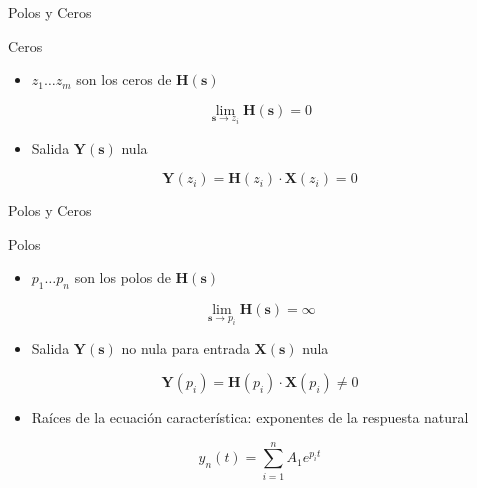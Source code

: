 \documentclass[xcolor={usenames,svgnames,dvipsnames}]{beamer}
\newcommand{\laplace}[1]{\mathbf{#1}(\mathbf{s})}
\newcommand{\slp}{\mathbf{s}}
\begin{document}
\begin{frame}[label={sec:orgd50bdfe}]{Polos y Ceros}
\begin{block}{Ceros}
\begin{itemize}
\item \(z_1 \ldots z_m\) son los ceros de \(\laplace{H}\)
\end{itemize}

\[
\lim_{\slp \to z_i}\laplace{H} = 0
\]

\begin{itemize}
\item Salida \(\laplace{Y}\) nula
\end{itemize}

\[
\mathbf{Y}(z_i) = \mathbf{H}(z_i) \cdot \mathbf{X}(z_i)  = 0
\]
\end{block}
\end{frame}

\begin{frame}[label={sec:org9e2dd8b}]{Polos y Ceros}
\begin{block}{Polos}
\begin{itemize}
\item \(p_1 \ldots p_n\) son los polos de \(\laplace{H}\)
\end{itemize}

\[
\lim_{\slp \to p_i}\laplace{H} = \infty
\]

\begin{itemize}
\item Salida \(\laplace{Y}\) no nula para entrada \(\laplace{X}\) nula
\end{itemize}
\[
\mathbf{Y}(p_i) = \mathbf{H}(p_i) \cdot \mathbf{X}(p_i) \neq 0
\]

\begin{itemize}
\item Raíces de la ecuación característica: \alert{exponentes de la respuesta natural}
\end{itemize}

\[
  y_n(t) = \sum_{i = 1}^n A_1 e^{p_i t}
\]
\end{block}
\end{frame}
\end{document}
